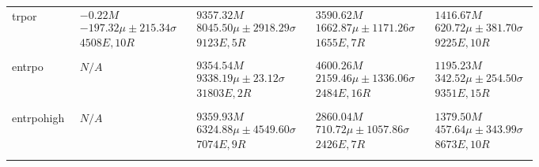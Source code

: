 \begin{tabular}{|l|p{3.2cm}|p{3.2cm}|p{3.2cm}|p{3.2cm}|}
trpor & $\begin{array}{c} -0.22M \\ -197.32\mu \pm 215.34\sigma \\ 4508E, 10R \end{array}$ & $\begin{array}{c} 9357.32M \\ 8045.50\mu \pm 2918.29\sigma \\ 9123E, 5R \end{array}$ & $\begin{array}{c} 3590.62M \\ 1662.87\mu \pm 1171.26\sigma \\ 1655E, 7R \end{array}$ & $\begin{array}{c} 1416.67M \\ 620.72\mu \pm 381.70\sigma \\ 9225E, 10R \end{array}$ \\ \\ \hline
entrpo & $\begin{array}{c} N/A \end{array}$ & $\begin{array}{c} 9354.54M \\ 9338.19\mu \pm 23.12\sigma \\ 31803E, 2R \end{array}$ & $\begin{array}{c} 4600.26M \\ 2159.46\mu \pm 1336.06\sigma \\ 2484E, 16R \end{array}$ & $\begin{array}{c} 1195.23M \\ 342.52\mu \pm 254.50\sigma \\ 9351E, 15R \end{array}$ \\ \\ \hline
entrpohigh & $\begin{array}{c} N/A \end{array}$ & $\begin{array}{c} 9359.93M \\ 6324.88\mu \pm 4549.60\sigma \\ 7074E, 9R \end{array}$ & $\begin{array}{c} 2860.04M \\ 710.72\mu \pm 1057.86\sigma \\ 2426E, 7R \end{array}$ & $\begin{array}{c} 1379.50M \\ 457.64\mu \pm 343.99\sigma \\ 8673E, 10R \end{array}$ \\ \\ \hline

\end{tabular}
